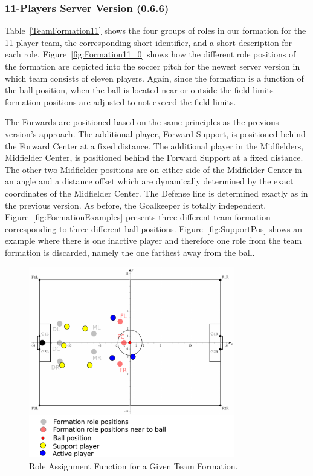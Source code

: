 \subsubsection*{11-Players Server Version (0.6.6)} 

Table~\ref{TeamFormation11} shows the four groups of roles in our formation for the 11-player team, the corresponding short identifier, and a short description for each role.
Figure~\ref{fig:Formation11_0} shows how the different role positions of the formation are depicted into the soccer pitch for the newest server version in which team consists of eleven players. Again, since the formation is a function of the ball position, when the ball is located near or outside the field limits formation positions are adjusted to not exceed the field limits.

The Forwards are positioned based on the same principles as the previous version's approach. The additional player, Forward Support, is positioned behind the Forward Center at a fixed distance. The additional player in the Midfielders, Midfielder Center, is positioned behind  the Forward Support at a fixed distance. The other two Midfielder positions are on either side of the Midfielder Center in an angle and a distance offset which are dynamically determined by the exact coordinates of the Midfielder Center. The Defense line is determined exactly as in the previous version. As before, the Goalkeeper is totally independent. Figure~\ref{fig:FormationExamples} presents three different team formation corresponding to three different ball positions. Figure~\ref{fig:SupportPos} shows an example where there is one inactive player and therefore one role from the team formation is discarded, namely the one farthest away from the ball. 


\clearpage


\begin{figure}[t!]
\centering
  \includegraphics[width=0.8\textwidth]{Chapter4/figures/RoleAss.pdf}
  \caption{Role Assignment Function for a Given Team Formation.} 
  \label{fig:RoleAss}
\end{figure}

